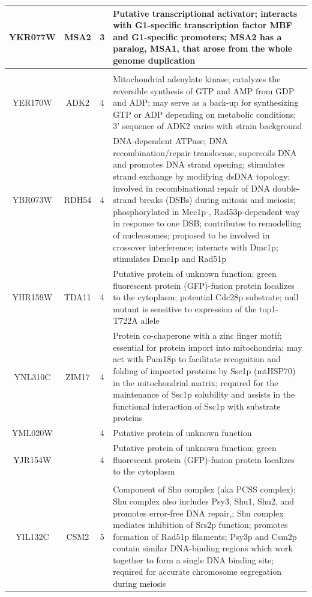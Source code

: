 \documentclass[]{article}
\begin{document}
\begin{longtable}{@{\extracolsep{3pt}} cccp{85mm}}
		YKR077W & MSA2 & 3 & Putative transcriptional activator; interacts with G1-specific transcription factor MBF and G1-specific promoters; MSA2 has a paralog, MSA1, that arose from the whole genome duplication \\ \hline \\[-1.8ex]
		YER170W & ADK2 & 4 & Mitochondrial adenylate kinase; catalyzes the reversible synthesis of GTP and AMP from GDP and ADP; may serve as a back-up for synthesizing GTP or ADP depending on metabolic conditions; 3' sequence of ADK2 varies with strain background \\ 
		YBR073W & RDH54 & 4 & DNA-dependent ATPase; DNA recombination/repair translocase, supercoils DNA and promotes DNA strand opening; stimulates strand exchange by modifying dsDNA topology; involved in recombinational repair of DNA double-strand breaks (DSBs) during mitosis and meiosis; phosphorylated in Mec1p-, Rad53p-dependent way in response to one DSB; contributes to remodelling of nucleosomes; proposed to be involved in crossover interference; interacts with Dmc1p; stimulates Dmc1p and Rad51p \\ 
		YHR159W & TDA11 & 4 & Putative protein of unknown function; green fluorescent protein (GFP)-fusion protein localizes to the cytoplasm; potential Cdc28p substrate; null mutant is sensitive to expression of the top1-T722A allele \\ 
		YNL310C & ZIM17 & 4 & Protein co-chaperone with a zinc finger motif; essential for protein import into mitochondria; may act with Pam18p to facilitate recognition and folding of imported proteins by Ssc1p (mtHSP70) in the mitochondrial matrix; required for the maintenance of Ssc1p solubility and assists in the functional interaction of Ssc1p with substrate proteins \\ 
		YML020W &  & 4 & Putative protein of unknown function \\ 
		YJR154W &  & 4 & Putative protein of unknown function; green fluorescent protein (GFP)-fusion protein localizes to the cytoplasm \\ \hline \\[-1.8ex]
		YIL132C & CSM2 & 5 & Component of Shu complex (aka PCSS complex); Shu complex also includes Psy3, Shu1, Shu2, and promotes error-free DNA repair,; Shu complex mediates inhibition of Srs2p function; promotes formation of Rad51p filaments; Psy3p and Csm2p contain similar DNA-binding regions which work together to form a single DNA binding site; required for accurate chromosome segregation during meiosis \\ 

\end{longtable}
\end{document}
